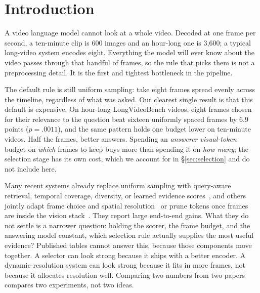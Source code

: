\documentclass[11pt]{article}
\begin{document}
\begin{abstract}
Holding the four axes fixed also shows how much rides on holding them: a porting error in our own AKS baseline made it reproduce global cosine top-$k$, and correcting it moved roughly 99.5\% of the selected frames while changing LVBench accuracy by 0.07 points, so aggregate accuracy concealed a baseline that was not implementing its own method; two matched harnesses running these same published rules at the same budget and encoder differ by 0.07 to 3.74 points; and the text handed to the scorer is worth a further two to four points.
Those margins are the size of the effects being compared, which is the case for running such comparisons inside one harness rather than across papers.
\end{abstract}

\section{Introduction}

A video language model cannot look at a whole video.
Decoded at one frame per second, a ten-minute clip is 600 images and an hour-long one is 3{,}600; a typical long-video system encodes eight.
Everything the model will ever know about the video passes through that handful of frames, so the rule that picks them is not a preprocessing detail.
It is the first and tightest bottleneck in the pipeline.

The default rule is still uniform sampling: take eight frames spread evenly across the timeline, regardless of what was asked.
Our clearest single result is that this default is expensive.
On hour-long LongVideoBench videos, eight frames chosen for their relevance to the question beat sixteen uniformly spaced frames by 6.9 points ($p{=}.0011$), and the same pattern holds one budget lower on ten-minute videos.
Half the frames, better answers.
Spending an \emph{answerer visual-token} budget on \emph{which} frames to keep buys more than spending it on \emph{how many}; the selection stage has its own cost, which we account for in \S\ref{sec:selection} and do not include here.

Many recent systems already replace uniform sampling with query-aware retrieval, temporal coverage, diversity, or learned evidence scores~\citep{tang2025aks,sun2025mdp3,zhu2025focus,wang2026evidential,peng2026qca}, and others jointly adapt frame choice and spatial resolution~\citep{zhang2025qframe,chen2026lddr,wang2026dafs} or prune tokens once frames are inside the vision stack~\citep{vistallm2026,moprune2026}.
They report large end-to-end gains.
What they do not settle is a narrower question: holding the scorer, the frame budget, and the answering model constant, which selection rule actually supplies the most useful evidence?
Published tables cannot answer this, because those components move together.
A selector can look strong because it ships with a better encoder.
A dynamic-resolution system can look strong because it fits in more frames, not because it allocates resolution well.
Comparing two numbers from two papers compares two experiments, not two ideas.
\end{document}
